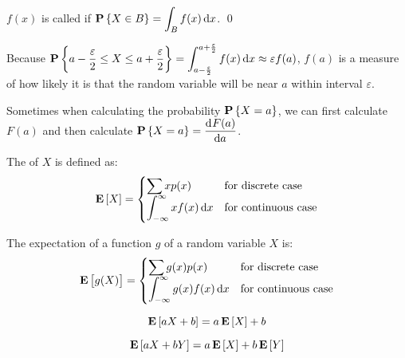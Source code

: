 \begin{definition}
    $f(x)$ is called  if $\probability{X \in B} = {\displaystyle \int_B f(x) \dif{x}} $. \qed
\end{definition}

Because $\probability{ a - \frac{\varepsilon}{2} \leq X \leq a + \frac{\varepsilon}{2} } =\displaystyle \int_{a - \frac{\varepsilon}{2}}^{a + \frac{\varepsilon}{2}} f(x) \dif{x} \approx \varepsilon f(a)  $, $f(a)$ is a measure of how likely it is that the random variable will be near $a$ within interval $\varepsilon$.


Sometimes when calculating the probability $\mathop{\bf P\/}\displaystyle \left\{X=a\right\}$, we can first calculate $F(a)$ and then calculate $\probability{X=a} = \dod{F(a)}{a}$.

\begin{definition}[expectation]
    The  of $X$ is defined as:
    \begin{equation}
        \expect{X} = \begin{cases}
            \displaystyle \sum x p(x) & \text{for discrete case} \\
            \displaystyle \int_{-\infty}^{\infty} x f(x) \dif{x} & \text{for continuous case}
        \end{cases}
    \end{equation}
\end{definition}




\begin{theorem}
    The expectation of a function $g$  of a random variable $X$ is:
    \begin{equation}
        \expect{g(X)} = \begin{cases}
            \displaystyle \sum g(x) p(x) & \text{for discrete case} \\
            \displaystyle \int_{-\infty}^{\infty} g(x) f(x) \dif{x} & \text{for continuous case}
        \end{cases}
    \end{equation}
\end{theorem}


\begin{theorem}
    \begin{equation}
        \mathop{\bf E\/}\displaystyle \left[ aX + b \right] = a \mathop{\bf E\/}\displaystyle \left[ X \right] + b
    \end{equation}    
\end{theorem}

\begin{theorem}
    \begin{equation}
        \mathop{\bf E\/}\displaystyle \left[ aX + bY \right] = a \mathop{\bf E\/}\displaystyle \left[ X \right] + b \mathop{\bf E\/}\displaystyle \left[ Y \right]
    \end{equation}    
\end{theorem}



